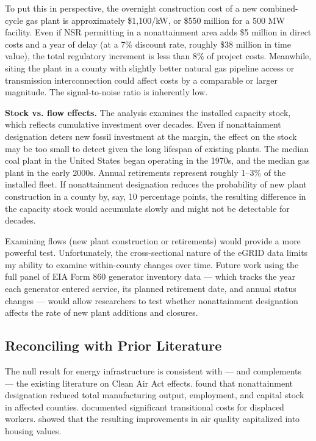 \documentclass[12pt]{article}
\begin{document}
To put this in perspective, the overnight construction cost of a new combined-cycle gas plant is approximately \$1,100/kW, or \$550 million for a 500 MW facility. Even if NSR permitting in a nonattainment area adds \$5 million in direct costs and a year of delay (at a 7\% discount rate, roughly \$38 million in time value), the total regulatory increment is less than 8\% of project costs. Meanwhile, siting the plant in a county with slightly better natural gas pipeline access or transmission interconnection could affect costs by a comparable or larger magnitude. The signal-to-noise ratio is inherently low.

\textbf{Stock vs. flow effects.} The analysis examines the installed capacity stock, which reflects cumulative investment over decades. Even if nonattainment designation deters new fossil investment at the margin, the effect on the stock may be too small to detect given the long lifespan of existing plants. The median coal plant in the United States began operating in the 1970s, and the median gas plant in the early 2000s. Annual retirements represent roughly 1--3\% of the installed fleet. If nonattainment designation reduces the probability of new plant construction in a county by, say, 10 percentage points, the resulting difference in the capacity stock would accumulate slowly and might not be detectable for decades.

Examining flows (new plant construction or retirements) would provide a more powerful test. Unfortunately, the cross-sectional nature of the eGRID data limits my ability to examine within-county changes over time. Future work using the full panel of EIA Form 860 generator inventory data --- which tracks the year each generator entered service, its planned retirement date, and annual status changes --- would allow researchers to test whether nonattainment designation affects the rate of new plant additions and closures.

\subsection{Reconciling with Prior Literature}

The null result for energy infrastructure is consistent with --- and complements --- the existing literature on Clean Air Act effects. \citet{greenstone2002impact} found that nonattainment designation reduced total manufacturing output, employment, and capital stock in affected counties. \citet{walker2013transitional} documented significant transitional costs for displaced workers. \citet{chay2005does} showed that the resulting improvements in air quality capitalized into housing values.
\end{document}
